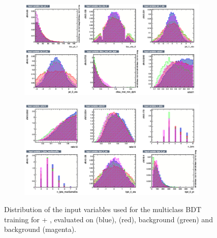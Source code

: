   \begin{figure}[htbp]
    \centering
  \begin{subfigure}{0.95\linewidth}
    \centering
    \includegraphics[width=\linewidth]{images/plots_tH_tHqb_for_thesis/variables_id_c3.png}
  \end{subfigure}
  \vspace{0.5cm} %
  \begin{subfigure}{0.95\linewidth}
    \centering
    \includegraphics[width=\linewidth]{images/plots_tH_tHqb_for_thesis/variables_id_c4.png}
  \end{subfigure}
  \vspace{0.5cm} %
  \caption{Distribution of the input variables used for the multiclass BDT training for \thtt + \ttHtt, evaluated on \ttHtt (blue), \thtt (red), \ztautau background (green) and \ttbar background (magenta).}
  \label{th_tth_vars_tmva_2}
  \end{figure}

